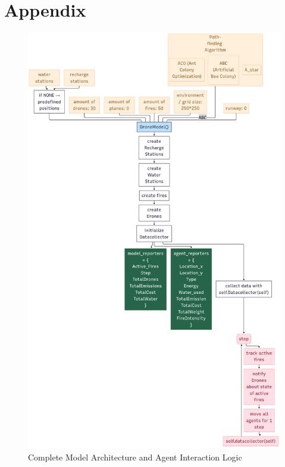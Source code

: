 \documentclass[11pt, a4paper]{article}
\begin{document}
\section*{Appendix}
\label{Appendix}
\label{app:modellogic}
\begin{figure}[H]
    \centering
    \includegraphics[width=1\textwidth]{figures/modellogic.png}
    \caption{Complete Model Architecture and Agent Interaction Logic}
    \label{fig:modellogic}
\end{figure}
\end{document}
